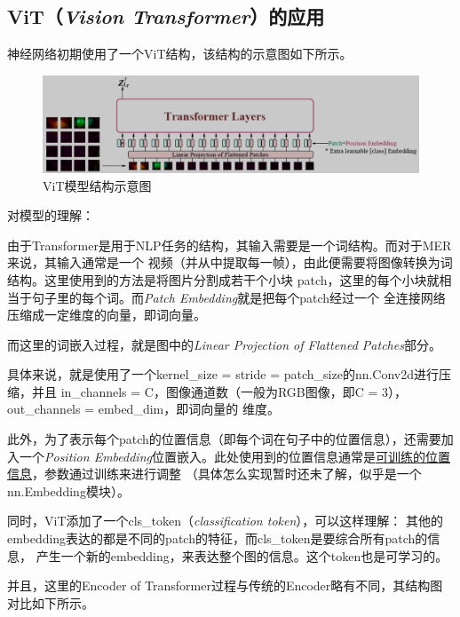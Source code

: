 \documentclass[AutoFakeBold]{MyFormat}
\begin{document}
\subsection{ViT（\textit{Vision Transformer}）的应用}
\par 神经网络初期使用了一个ViT结构，该结构的示意图如下所示。
\begin{figure}[!h]
    \centering
    \includegraphics[width=\linewidth]{figures/2022.07.31/ViT.png}
    \caption{ViT模型结构示意图}
\end{figure}
\par 对模型的理解：
\par 由于Transformer是用于NLP任务的结构，其输入需要是一个词结构。而对于MER来说，其输入通常是一个
视频（并从中提取每一帧），由此便需要将图像转换为词结构。这里使用到的方法是将图片分割成若干个小块
patch，这里的每个小块就相当于句子里的每个词。而\textit{Patch Embedding}就是把每个patch经过一个
全连接网络压缩成一定维度的向量，即词向量。
\par 而这里的词嵌入过程，就是图中的\textit{Linear Projection of Flattened Patches}部分。
\par 具体来说，就是使用了一个kernel\_size = stride = patch\_size的nn.Conv2d进行压缩，并且
in\_channels = C，图像通道数（一般为RGB图像，即C = 3），out\_channels = embed\_dim，即词向量的
维度。
\par 此外，为了表示每个patch的位置信息（即每个词在句子中的位置信息），还需要加入一个\textit{Position
Embedding}位置嵌入。此处使用到的位置信息通常是\underline{可训练的位置信息}，参数通过训练来进行调整
（具体怎么实现暂时还未了解，似乎是一个nn.Embedding模块）。
\par 同时，ViT添加了一个cls\_token（\textit{classification token}），可以这样理解：
其他的embedding表达的都是不同的patch的特征，而cls\_token是要综合所有patch的信息，
产生一个新的embedding，来表达整个图的信息。这个token也是可学习的。
\\\hspace*{\fill}
\par 并且，这里的Encoder of Transformer过程与传统的Encoder略有不同，其结构图对比如下所示。
\end{document}
